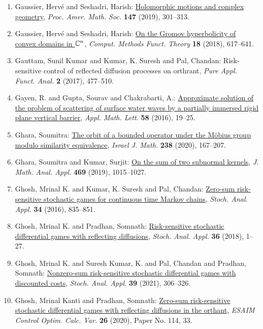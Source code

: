 \begin{enumerate}
\item Gaussier, Herv\'{e} and Seshadri, Harish: \href{https://doi.org/10.1090/proc/14217}{Holomorphic motions and complex geometry}, \emph{Proc. Amer. Math. Soc.} {\bf 147} (2019), 301--313.
\item Gaussier, Herv\'{e} and Seshadri, Harish: \href{https://doi.org/10.1007/s40315-018-0243-5}{On the {G}romov hyperbolicity of convex domains in {$\Bbb
C^n$}}, \emph{Comput. Methods Funct. Theory} {\bf 18} (2018), 617--641.
\item Gauttam, Sunil Kumar and Kumar, K. Suresh and Pal, Chandan: Risk-sensitive control of reflected diffusion processes on
orthrant, \emph{Pure Appl. Funct. Anal.} {\bf 2} (2017), 477--510.
\item Gayen, R. and Gupta, Sourav and Chakrabarti, A.: \href{https://doi.org/10.1016/j.aml.2016.01.018}{Approximate solution of the problem of scattering of surface
water waves by a partially immersed rigid plane vertical
barrier}, \emph{Appl. Math. Lett.} {\bf 58} (2016), 19--25.
\item Ghara, Soumitra: \href{https://doi.org/10.1007/s11856-020-2016-x}{The orbit of a bounded operator under the {M}\"{o}bius group
modulo similarity equivalence}, \emph{Israel J. Math.} {\bf 238} (2020), 167--207.
\item Ghara, Soumitra and Kumar, Surjit: \href{https://doi.org/10.1016/j.jmaa.2018.09.048}{On the sum of two subnormal kernels}, \emph{J. Math. Anal. Appl.} {\bf 469} (2019), 1015--1027.
\item Ghosh, Mrinal K. and Kumar, K. Suresh and Pal, Chandan: \href{https://doi.org/10.1080/07362994.2016.1180995}{Zero-sum risk-sensitive stochastic games for continuous time
{M}arkov chains}, \emph{Stoch. Anal. Appl.} {\bf 34} (2016), 835--851.
\item Ghosh, Mrinal K. and Pradhan, Somnath: \href{https://doi.org/10.1080/07362994.2017.1356732}{Risk-sensitive stochastic differential games with reflecting
diffusions}, \emph{Stoch. Anal. Appl.} {\bf 36} (2018), 1--27.
\item Ghosh, Mrinal K. and Suresh Kumar, K. and Pal, Chandan and
Pradhan, Somnath: \href{https://doi.org/10.1080/07362994.2020.1796707}{Nonzero-sum risk-sensitive stochastic differential games with
discounted costs}, \emph{Stoch. Anal. Appl.} {\bf 39} (2021), 306--326.
\item Ghosh, Mrinal Kanti and Pradhan, Somnath: \href{https://doi.org/10.1051/cocv/2020029}{Zero-sum risk-sensitive stochastic differential games with
reflecting diffusions in the orthant}, \emph{ESAIM Control Optim. Calc. Var.} {\bf 26} (2020), Paper No. 114, 33.

\end{enumerate}
